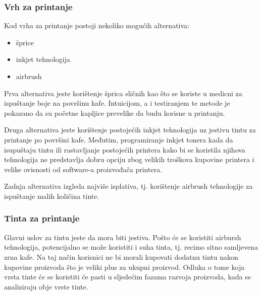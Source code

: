 \documentclass[12pt]{article}
\begin{document}
\subsubsection{Vrh za printanje}
Kod vrha za printanje postoji nekoliko mogućih alternativa:
\begin{itemize}
\item šprice 
\item inkjet tehnologija
\item airbrush
\end{itemize}

Prva alternativa jeste korištenje šprica sličnih kao što se koriste u medicni za ispuštanje boje na površinu kafe. Intuicijom, a i testiranjem te metode je pokazano da su početne kapljice prevelike da budu korisne u printanju.

Druga alternativa jeste korištenje postojećih inkjet tehnologija uz jestivu tintu za printanje po površini kafe. Međutim, programiranje inkjet tonera kada da isupuštaju tintu ili rastavljanje postojećih printera kako bi se koristila njihova tehnologija ne predstavlja dobru opciju zbog velikih troškova kupovine printera i velike ovisnosti od software-a proizvođača printera.

Zadnja alternativa izgleda najviše isplativa, tj. korištenje airbrush tehnologije za ispuštanje malih količina tinte. 

\subsubsection{Tinta za printanje}

Glavni uslov za tintu jeste da mora biti jestiva. Pošto će se koristiti airbursh tehnologija, potencijalno se može koristiti i suha tinta, tj. recimo sitno samljevena zrna kafe. Na taj način korisnici ne bi morali kupovati dodatnu tintu nakon kupovine proizvoda što je veliki plus za ukupni proizvod. Odluka o tome koja vrsta tinte će se koristiti će pasti u sljedećim fazama razvoja proizvoda, kada se analiziraju obje vrste tinte.

\newpage
\renewcommand{\refname}{Izvori}

\nocite{*}

\end{document}
